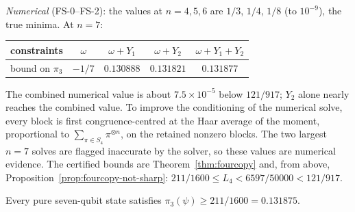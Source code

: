 \noindent\emph{Numerical} (FS-0--FS-2): the values at $n=4,5,6$ are $1/3$, $1/4$, $1/8$ (to
$10^{-9}$), the true minima. At $n=7$:
\begin{center}
\begin{tabular}{@{}lcccc@{}}
\toprule
constraints & $\omega$ & $\omega+Y_1$ & $\omega+Y_2$ & $\omega+Y_1+Y_2$\\
\midrule
bound on $\pi_3$ & $-1/7$ & $0.130888$ & $0.131821$ & $0.131877$\\
\bottomrule
\end{tabular}
\end{center}
The combined numerical value is about $7.5\times10^{-5}$ below $121/917$;
$Y_2$ alone nearly reaches the combined value. To improve the conditioning of the numerical solve, every block is first congruence-centred at the Haar average of the moment,
proportional to $\sum_{\pi\in S_4}\pi^{\otimes n}$, on the retained nonzero blocks.
The two largest $n=7$ solves are flagged inaccurate by the solver, so these values are
numerical evidence. The certified bounds are Theorem~\ref{thm:fourcopy} and, from above,
Proposition~\ref{prop:fourcopy-not-sharp}: $211/1600\le L_4<6597/50000<121/917$.

\begin{theorem}\label{thm:fourcopy}
Every pure seven-qubit state satisfies $\pi_3(\psi)\ge 211/1600 = 0.131875$.
\end{theorem}

